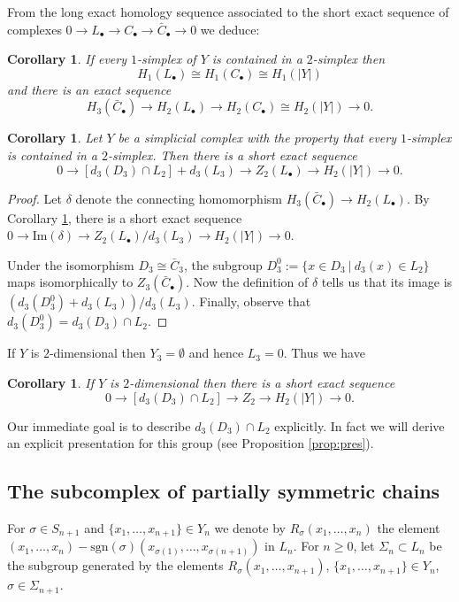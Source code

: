 \documentclass[12pt]{amsart}
\newtheorem{cor}[lem]{Corollary}
\theoremstyle{definition}
\renewcommand{\S}{\Sigma}
\newcommand{\<}{\langle}
\renewcommand{\>}{\rangle}
\renewcommand{\ker}[1]{\mathrm{Ker}(#1)}
\newcommand{\image}[1]{\mathrm{Im}(#1)}
\newcommand{\sgn}[1]{\mathrm{sgn}(#1)}
\renewcommand{\sgn}[1]{\mathrm{sgn}(#1)}
\begin{document}
From the long exact homology sequence associated to the short exact sequence of complexes $0\to L_\bullet\to C_\bullet\to \bar{C}_\bullet\to 0$ we deduce:
\begin{cor}\label{cor:exact} If every $1$-simplex of $Y$ is contained in a $2$-simplex then
 \[
H_1(L_\bullet)\cong H_1(C_\bullet)\cong H_1(|Y|)
\]
and there is an exact sequence 
\[
H_3(\bar{C}_\bullet)\to H_2(L_\bullet)\to H_2(C_\bullet)\cong H_2(|Y|)\to 0.
\]
\end{cor}

\begin{cor}\label{cor:ses} Let $Y$ be a simplicial complex with the property that every $1$-simplex is contained in a $2$-simplex. 
Then there is a short exact sequence
\[
0\to \left[d_3(D_3)\cap L_2\right]+d_3(L_3)\to Z_2(L_\bullet)\to H_2(|Y|)\to 0.
\]
\end{cor}

\begin{proof} Let $\delta$ denote the connecting homomorphism $H_3(\bar{C}_\bullet)\to H_2(L_\bullet)$.
By Corollary \ref{cor:exact}, there is a short exact sequence $0\to\image{\delta}\to Z_2(L_\bullet)/d_3(L_3)\to H_2(|Y|)\to 0$. 

Under the isomorphism $D_3\cong \bar{C}_3$, the subgroup $D_3^0:=\{ x\in D_3\ |\ d_3(x)\in L_2\}$ maps isomorphically to 
${Z}_3(\bar{C}_\bullet)$.  Now the definition of $\delta$ tells us that its image  is $\left(d_3(D_3^0)+d_3(L_3)\right)/d_3(L_3)$. Finally, observe that $d_3(D_3^0)=d_3(D_3)\cap L_2$.
\end{proof}

If $Y$ is $2$-dimensional then $Y_3=\emptyset$ and hence $L_3=0$. Thus we have 
\begin{cor}\label{cor:2dim} If $Y$ is $2$-dimensional then there is a short exact sequence
\[
0\to \left[d_3(D_3)\cap L_2\right]\to Z_2\to H_2(|Y|)\to 0.
\]
\end{cor}
Our immediate goal is to describe $d_3(D_3)\cap L_2$ explicitly. In fact we will derive an explicit  presentation for this group (see Proposition \ref{prop:pres}).



\subsection{The subcomplex of partially symmetric chains}
For $\sigma\in S_{n+1}$ and $\{ x_1,\ldots,x_{n+1}\}\in Y_n$ we denote by $R_{\sigma}(x_1,\ldots,x_n)$ the element $(x_1,\ldots,x_n)-\sgn{\sigma}(x_{\sigma(1)},\ldots,x_{\sigma(n+1)})$ 
in $L_n$.  For $n\geq 0$, let $\Sigma_n\subset L_n$ be the subgroup generated by the elements $R_{\sigma}(x_1,\ldots,x_{n+1})$, $\{x_1,\ldots,x_{n+1}\}\in Y_n$, $\sigma\in \S_{n+1}$.
\end{document}

